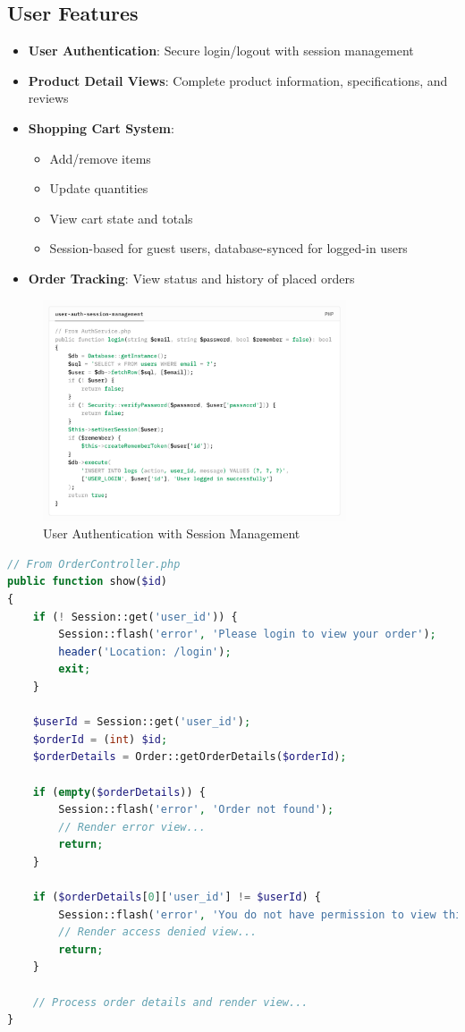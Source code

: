 \documentclass{article}
\begin{document}
\subsection{User Features}
\begin{itemize}
	\item \textbf{User Authentication}: Secure login/logout with session management
	\item \textbf{Product Detail Views}: Complete product information, specifications, and reviews
	\item \textbf{Shopping Cart System}:
	      \begin{itemize}
		      \item Add/remove items
		      \item Update quantities
		      \item View cart state and totals
		      \item Session-based for guest users, database-synced for logged-in users
	      \end{itemize}
	\item \textbf{Order Tracking}: View status and history of placed orders
\end{itemize}

\begin{figure}[H]
	\centering
	\includegraphics[width=0.8\textwidth]{images/user-auth-session-management.png}
	\caption{User Authentication with Session Management}
\end{figure}

\begin{lstlisting}[language=PHP, caption=Order tracking implementation]
// From OrderController.php
public function show($id)
{
    if (! Session::get('user_id')) {
        Session::flash('error', 'Please login to view your order');
        header('Location: /login');
        exit;
    }

    $userId = Session::get('user_id');
    $orderId = (int) $id;
    $orderDetails = Order::getOrderDetails($orderId);

    if (empty($orderDetails)) {
        Session::flash('error', 'Order not found');
        // Render error view...
        return;
    }

    if ($orderDetails[0]['user_id'] != $userId) {
        Session::flash('error', 'You do not have permission to view this order');
        // Render access denied view...
        return;
    }

    // Process order details and render view...
}
\end{lstlisting}
\end{document}
